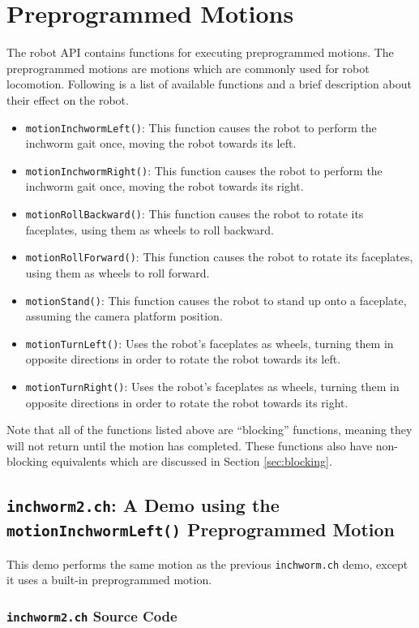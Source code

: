\documentclass{article}
\begin{document}
\section{Preprogrammed Motions}
The robot API contains functions for executing preprogrammed motions. The 
preprogrammed motions are motions which are commonly used for robot locomotion.
Following is a list of available functions and a brief description about
their effect on the robot.
\begin{itemize}
\item \texttt{motionInchwormLeft()}: This function causes the robot to perform
  the inchworm gait once, moving the robot towards its left.
\item \texttt{motionInchwormRight()}: This function causes the robot to perform
  the inchworm gait once, moving the robot towards its right.
\item \texttt{motionRollBackward()}: This function causes the robot to rotate
  its faceplates, using them as wheels to roll backward.
\item \texttt{motionRollForward()}: This function causes the robot to rotate
  its faceplates, using them as wheels to roll forward.
\item \texttt{motionStand()}: This function causes the robot to stand up onto a 
  faceplate, assuming the camera platform position.
\item \texttt{motionTurnLeft()}: Uses the robot's faceplates as wheels, turning
  them in opposite directions in order to rotate the robot towards its left.
\item \texttt{motionTurnRight()}: Uses the robot's faceplates as wheels, turning
  them in opposite directions in order to rotate the robot towards its right.
\end{itemize}

Note that all of the functions listed above are ``blocking'' functions, meaning
they will not return until the motion has completed. These functions also
have non-blocking equivalents which are discussed in Section
\ref{sec:blocking}.

\subsection{\texttt{inchworm2.ch}: A Demo using the \texttt{motionInchwormLeft()}
Preprogrammed Motion}
This demo performs the same motion as the previous \texttt{inchworm.ch} demo,
except it uses a built-in preprogrammed motion.
\subsubsection{\texttt{inchworm2.ch} Source Code}

\end{document}
